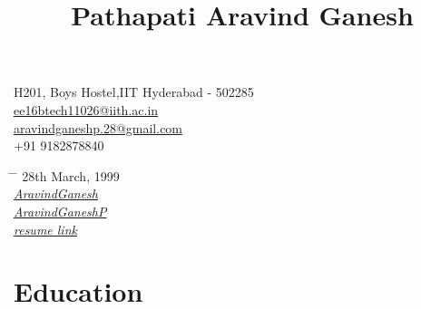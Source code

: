 \documentclass[10pt]{report} %
\begin{document}

\title{Pathapati Aravind Ganesh} %


\parbox{0.5\textwidth}{ %
\begin{tabbing} %
\faMapMarker \hspace{3} H201, Boys Hostel,IIT Hyderabad - 502285  \\ 
\faEnvelope \hspace{2} \href{mailto:ee16btech11026@iith.ac.in}{ee16btech11026@iith.ac.in}\\
\faEnvelope \hspace{2} \href{mailto:aravindganeshp.28@gmail.com}{aravindganeshp.28@gmail.com}\\
\faPhone \hspace{2} +91 9182878840
\end{tabbing}}
\hfill %
\parbox{0.5\textwidth}{ %
\begin{tabbing} %
\hspace{0.5cm} \= \hspace{0.5cm} \= \kill %
\faBirthdayCake  \> 28th March, 1999 \\ %
\faGithub \> \href{https://github.com/AravindGanesh}{\textit{AravindGanesh}} \\
\faLinkedin \> \href{https://www.linkedin.com/in/AravindGaneshP}{\textit{AravindGaneshP}} \\
\faLink \> \href{https://github.com/AravindGanesh/resume}{\textit{resume link}}
\end{tabbing}}

\hline

\section{Education}
\end{document}
